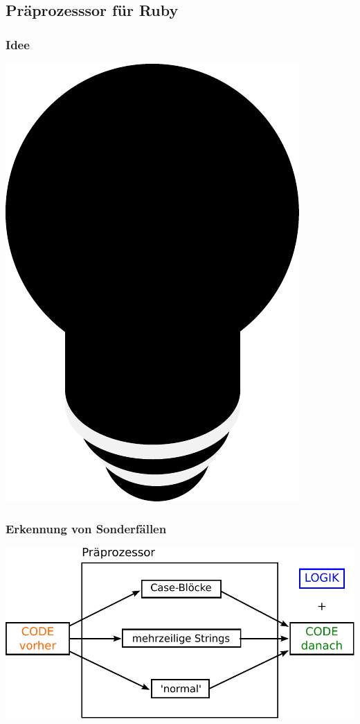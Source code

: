 \subsection{Präprozesssor für Ruby}

\begin{frame}
\frametitle{Idee}
\begin{center}
\includegraphics[scale=0.5]{preprocessor/pics/Idee}
\end{center}
\end{frame}

\begin{frame}
\frametitle{Erkennung von Sonderfällen}
	\includegraphics[scale=0.70]{preprocessor/pics/CodeArten}
\end{frame}

